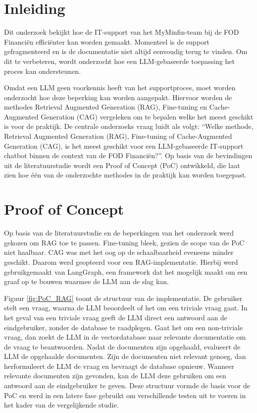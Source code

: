 \documentclass[a0,portrait]{hogent-poster}
\begin{document}
\begin{multicols}{2} %

\section{Inleiding}

Dit onderzoek bekijkt hoe de IT-support van het MyMinfin-team bij de FOD Financiën efficiënter kan worden gemaakt. Momenteel is de support gefragmenteerd en is de documentatie niet altijd eenvoudig terug te vinden. Om dit te verbeteren, wordt onderzocht hoe een LLM-gebaseerde toepassing het proces kan ondersteunen.

Omdat een LLM geen voorkennis heeft van het supportproces, moet worden onderzocht hoe deze beperking kan worden aangepakt. Hiervoor worden de methodes Retrieval Augmented Generation (RAG), Fine-tuning en Cache-Augmented Generation (CAG) vergeleken om te bepalen welke het meest geschikt is voor de praktijk. De centrale onderzoeks vraag luidt als volgt: “Welke methode, Retrieval Augmented Generation (RAG), Fine-tuning of Cache-Augmented Generation (CAG), is het meest geschikt voor een LLM-gebaseerde IT-support chatbot binnen de context van de FOD Financiën?”. Op basis van de bevindingen uit de literatuurstudie wordt een Proof of Concept (PoC) ontwikkeld, die laat zien hoe één van de onderzochte methodes in de praktijk kan worden toegepast.

\section{Proof of Concept}

Op basis van de literatuurstudie en de beperkingen van het onderzoek werd gekozen om RAG toe te passen. Fine-tuning bleek, gezien de scope van de PoC niet haalbaar. CAG was met het oog op de schaalbaarheid eveneens minder geschikt. Daarom werd geopteerd voor een RAG-implementatie. Hierbij werd gebruikgemaakt van LangGraph, een framework dat het mogelijk maakt om een graaf op te bouwen waarmee de LLM aan de slag kan.

Figuur \ref{fig:PoC_RAG} toont de structuur van de implementatie. De gebruiker stelt een vraag, waarna de LLM beoordeelt of het om een triviale vraag gaat. In het geval van een triviale vraag geeft de LLM direct een antwoord aan de eindgebruiker, zonder de database te raadplegen. Gaat het om een non-triviale vraag, dan zoekt de LLM in de vectordatabase naar relevante documentatie om de vraag te beantwoorden. Nadat de documenten zijn opgehaald, evalueert de LLM de opgehaalde documenten. Zijn de documenten niet relevant genoeg, dan herformuleert de LLM de vraag en bevraagt de database opnieuw. Wanneer relevante documenten zijn gevonden, kan de LLM deze gebruiken om een antwoord aan de eindgebruiker te geven. Deze structuur vormde de basis voor de PoC en werd in een latere fase gebruikt om verschillende testen uit te voeren in het kader van de vergelijkende studie.


\end{multicols}
\end{document}
